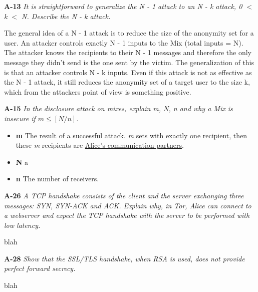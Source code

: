 \documentclass[a4paper]{article}
\newcommand{\Q}[2]{ \vspace{10pt} \textbf{#1} \textit{#2} }
\newcommand{\A}[1]{ #1 }
\begin{document}
\Q{A-13} { %
  It is straightforward to generalize the N - 1 attack to an 
  N - k attack, 0 $<$ k $<$ N. Describe the N - k attack.
}

\A{
  The general idea of a N - 1 attack is to reduce the size of
  the anonymity set for a user. An attacker controls exactly N - 1 
  inputs to the Mix (total inputs = N). The attacker knows
  the recipients to their N - 1 messages and therefore the only 
  message they didn't send is the one sent by the victim.
  The generalization of this is that an attacker controls N - k
  inputs. Even if this attack is not as effective as the N - 1
  attack, it still reduces the anonymity set of a target user 
  to the size k, which from the attackers point of view
  is something positive.  
}

\Q{A-15} {
  In the disclosure attack on mixes, 
  explain m, N, n and why a Mix is insecure if $m \leq [N / n]$.
}

\A{
  \begin{itemize}
    \item \textbf{m} The result of a successful attack. 
    \textit{m} sets with exactly one recipient, then these \textit{m}
    recipients are \underline{Alice's communication partners}. 
    \item \textbf{N} a
    \item \textbf{n} The number of receivers.
  \end{itemize}
}

\Q{A-26} {
  A TCP handshake consists of the client and the server exchanging 
  three messages: SYN, SYN-ACK and ACK. 
  Explain why, in Tor, Alice can connect to a webserver and expect 
  the TCP handshake with the
  server to be performed with low latency.
}

\A{
  blah
}

\Q{A-28} {
  Show that the SSL/TLS handshake, when RSA is used, 
  does not provide perfect forward secrecy.
}

\A{
  blah
}


\end{document}
